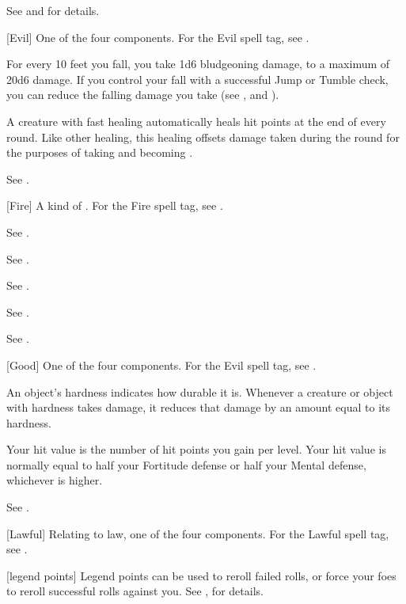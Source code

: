 See  and  for details.

[Evil] One of the four  components. For the Evil spell tag, see .

 For every 10 feet you fall, you take 1d6 bludgeoning damage, to a maximum of 20d6 damage.
If you control your fall with a successful Jump or Tumble check, you can reduce the falling damage you take (see , and ).

 A creature with fast healing automatically heals hit points at the end of every round.
Like other healing, this healing offsets damage taken during the round for the purposes of taking  and becoming \disabled.

 See .

[Fire] A kind of . For the Fire spell tag, see .

 See .

 See .

 See .

 See .

 See .

[Good] One of the four  components. For the Evil spell tag, see .

 An object's hardness indicates how durable it is.
Whenever a creature or object with hardness takes damage, it reduces that damage by an amount equal to its hardness.

 Your hit value is the number of hit points you gain per level.
Your hit value is normally equal to half your Fortitude defense or half your Mental defense, whichever is higher.

 See .

[Lawful] Relating to law, one of the four  components. For the Lawful spell tag, see .

[legend points] Legend points can be used to reroll failed rolls, or force your foes to reroll successful rolls against you. See , for details.

